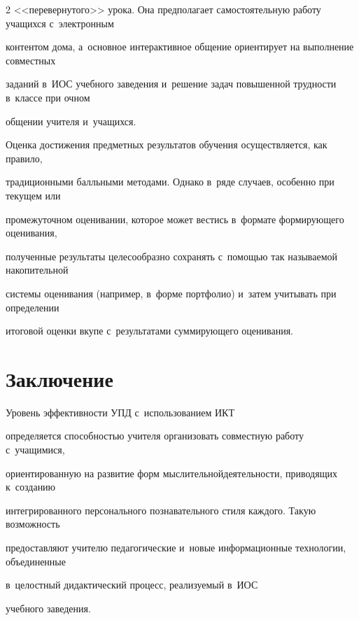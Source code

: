 \begin{multicols}{2}
<<перевернутого>> урока. Она предполагает самостоятельную работу учащихся с~электронным


контентом дома, а~основное интерактивное общение ориентирует на выполнение совместных


заданий в~ИОС учебного заведения и~решение задач повышенной труд\-ности в~классе при очном


общении учителя и~уча\-щихся.


{ %





}





  Оценка достижения предметных результатов обучения осуществляется, как правило,


традиционными балльными методами. Однако в~ряде случаев, особенно при текущем или


промежуточном оценивании, которое может вестись в~формате формирующего оценивания,


полученные результаты целесообразно сохранять с~помощью так называемой накопительной


системы оценивания (например, в~форме портфолио) и~затем учитывать при определении


итоговой оценки вкупе с~результатами суммирующего оценивания.





\section{Заключение}





  Уровень эффективности УПД с~использованием ИКТ


определяется способностью учителя организовать совместную работу с~учащимися,


ориентированную на развитие форм мыслительной\linebreak деятель\-ности, приводящих к~созданию


интегрированного персонального познавательного стиля каж\-до\-го. Такую возможность


предоставляют учи\-телю педагогические и~новые информационные техноло\-гии, объединенные


в~целостный дидактический процесс, реализуемый в~ИОС


учебного заведения.






\end{multicols}
